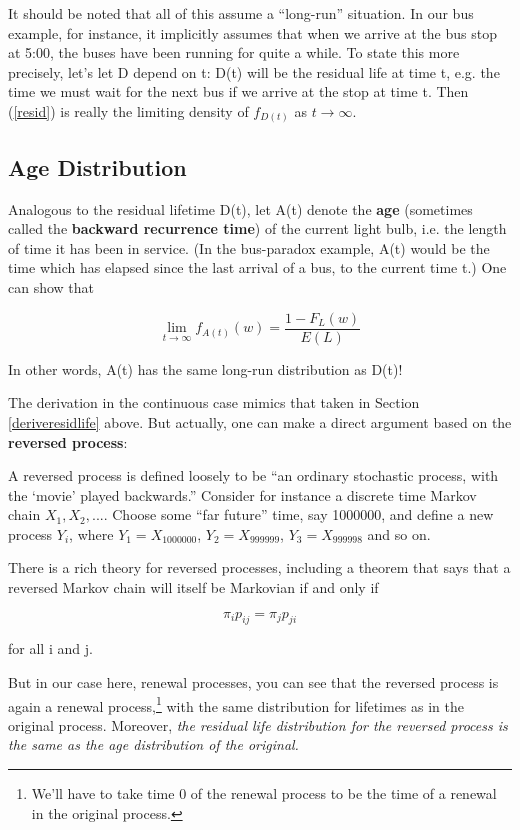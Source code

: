 It should be noted that all of this assume a ``long-run'' situation.  In
our bus example, for instance, it implicitly assumes that when we arrive
at the bus stop at 5:00, the buses have been running for quite a while.
To state this more precisely, let's let D depend on t:  D(t) will be the
residual life at time t, e.g. the time we must wait for the next bus if
we arrive at the stop at time t.  Then (\ref{resid}) is really
the limiting density of $f_{D(t)}$ as $t \rightarrow \infty$.

\subsection{Age Distribution}
\label{agedistribution}

Analogous to the residual lifetime D(t), let A(t) denote the
\textbf{age} (sometimes called the \textbf{backward recurrence time}) of
the current light bulb, i.e.  the length of time it has been in service.
(In the bus-paradox example, A(t) would be the time which has elapsed
since the last arrival of a bus, to the current time t.) One can show that

\begin{equation}
\label{age}
\lim_{t\rightarrow \infty }f_{A(t)}(w)=\frac{1-F_{L}(w)}{E(L)}
\end{equation}

In other words, A(t) has the same long-run distribution as D(t)!

The derivation in the continuous case mimics that taken in Section
\ref{deriveresidlife} above.  But actually, one can make a direct
argument based on the {\bf reversed process}:

A reversed process is defined loosely to be ``an ordinary stochastic
process, with the `movie' played backwards.''  Consider for instance a
discrete time Markov chain $X_1, X_2,...$.  Choose some ``far future''
time, say 1000000, and define a new process $Y_i$, where $Y_1 =
X_{1000000}$, $Y_2 = X_{999999}$, $Y_3 = X_{999998}$ and so on.

There is a rich theory for reversed processes, including a theorem that
says that a reversed Markov chain will itself be Markovian if and only
if

\begin{equation}
\pi_i p_{ij} = \pi_j p_{ji}
\end{equation}

for all i and j.

But in our case here, renewal processes, you can see that the reversed
process is again a renewal process,\footnote{We'll have to take time 0
of the renewal process to be the time of a renewal in the original
process.} with the same distribution for lifetimes as in the original
process.  Moreover, {\it the residual life distribution for the reversed
process is the same as the age distribution of the original.}  

